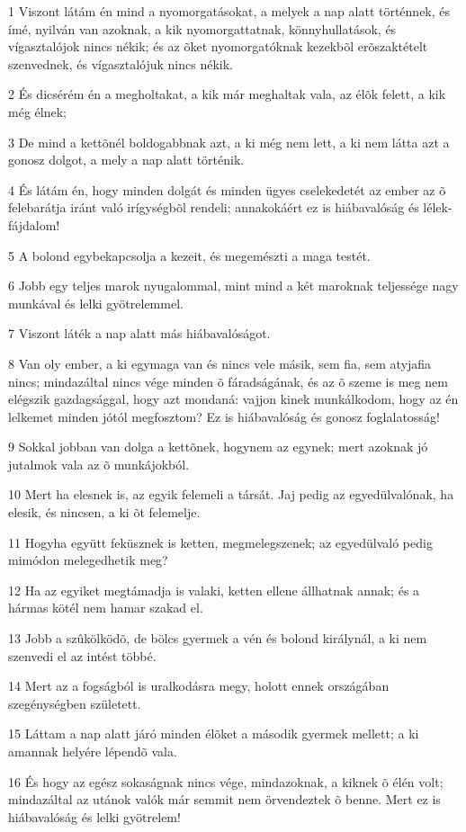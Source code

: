 \par 1 Viszont látám én mind a nyomorgatásokat, a melyek a nap alatt történnek, és ímé, nyilván van azoknak, a kik nyomorgattatnak, könnyhullatások, és vígasztalójok nincs nékik; és az õket nyomorgatóknak kezekbõl erõszaktételt szenvednek, és vígasztalójuk nincs nékik.
\par 2 És dicsérém én a megholtakat, a kik már meghaltak vala, az élõk felett, a kik még élnek;
\par 3 De mind a kettõnél boldogabbnak azt, a ki még nem lett, a ki nem látta azt a gonosz dolgot, a mely a nap alatt történik.
\par 4 És látám én, hogy minden dolgát és minden ügyes cselekedetét az ember az õ felebarátja iránt való irígységbõl rendeli; annakokáért ez is hiábavalóság és lélek-fájdalom!
\par 5 A bolond egybekapcsolja a kezeit, és megemészti a maga testét.
\par 6 Jobb egy teljes marok nyugalommal, mint mind a két maroknak teljessége nagy munkával és lelki gyötrelemmel.
\par 7 Viszont láték a nap alatt más hiábavalóságot.
\par 8 Van oly ember, a ki egymaga van és nincs vele másik, sem fia, sem atyjafia nincs; mindazáltal nincs vége minden õ fáradságának, és az õ szeme is meg nem elégszik gazdagsággal, hogy azt mondaná: vajjon kinek munkálkodom, hogy az én lelkemet minden jótól megfosztom? Ez is hiábavalóság és gonosz foglalatosság!
\par 9 Sokkal jobban van dolga a kettõnek, hogynem az egynek; mert azoknak jó jutalmok vala az õ munkájokból.
\par 10 Mert ha elesnek is, az egyik felemeli a társát. Jaj pedig az egyedülvalónak, ha elesik, és nincsen, a ki õt felemelje.
\par 11 Hogyha együtt feküsznek is ketten, megmelegszenek; az egyedülvaló pedig mimódon melegedhetik meg?
\par 12 Ha az egyiket megtámadja is valaki, ketten ellene állhatnak annak; és a hármas kötél nem hamar szakad el.
\par 13 Jobb a szûkölködõ, de bölcs gyermek a vén és bolond királynál, a ki nem szenvedi el az intést többé.
\par 14 Mert az a fogságból is uralkodásra megy, holott ennek országában szegénységben született.
\par 15 Láttam a nap alatt járó minden élõket a második gyermek mellett; a ki amannak helyére lépendõ vala.
\par 16 És hogy az egész sokaságnak nincs vége, mindazoknak, a kiknek õ élén volt; mindazáltal az utánok valók már semmit nem örvendeztek õ benne. Mert ez is hiábavalóság és lelki gyötrelem!

